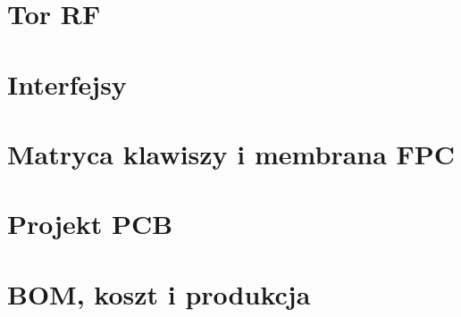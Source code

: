 \section{Tor RF}\label{sec:rf}

\section{Interfejsy}\label{sec:interfejsy}

\section{Matryca klawiszy i membrana FPC}\label{sec:membrana}

\section{Projekt PCB}\label{sec:pcb}

\section{BOM, koszt i produkcja}\label{sec:bom}

